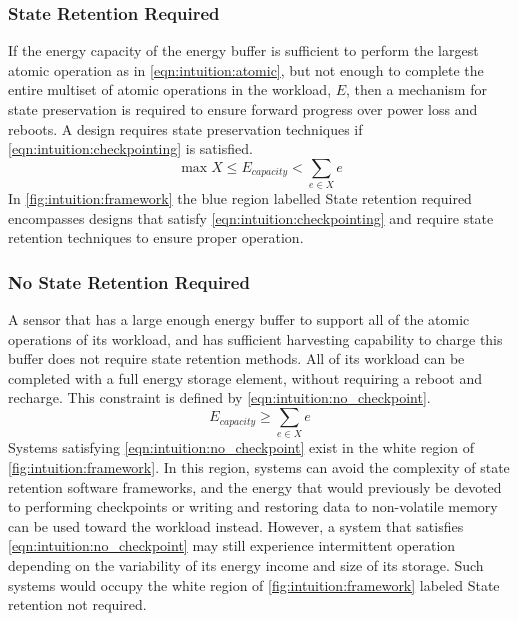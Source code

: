 \subsubsection{State Retention Required}
If the energy capacity of the energy buffer 
is sufficient to perform the largest atomic operation as in \cref{eqn:intuition:atomic}, but
not enough to complete
the entire multiset of atomic operations in the workload, $E$,
then a mechanism for state preservation is required to ensure forward progress over power loss and reboots.
A design requires state preservation techniques if \cref{eqn:intuition:checkpointing} is satisfied.
\begin{equation}
    \label{eqn:intuition:checkpointing}
    \max X \leq E_{capacity} < \sum_{e \in X} e
\end{equation}
In \cref{fig:intuition:framework} the blue region labelled \textsf{State retention required} encompasses designs that satisfy \cref{eqn:intuition:checkpointing} and require state retention techniques to ensure proper operation.  

\subsubsection{No State Retention Required} 
A sensor that has a large enough energy buffer to support all of the atomic operations of its workload, and has sufficient harvesting capability to charge this buffer does not require state retention methods. All of its workload can be completed with a full energy storage element, without requiring a reboot and recharge.
This constraint is defined by \cref{eqn:intuition:no_checkpoint}.
\begin{equation}
    \label{eqn:intuition:no_checkpoint}
    E_{capacity} \geq \sum_{e \in X} e 
\end{equation}
Systems satisfying \cref{eqn:intuition:no_checkpoint} exist in the white region of \cref{fig:intuition:framework}.
In this region, systems can avoid the complexity of state retention software frameworks, and the energy that would previously be devoted to performing checkpoints or writing and restoring data to non-volatile memory can be used toward the workload instead. 
However, a system that satisfies \cref{eqn:intuition:no_checkpoint} may still experience intermittent operation depending on the variability of its energy income and size of its storage. Such systems would occupy the white region of \cref{fig:intuition:framework} labeled \textsf{State retention not required}.

